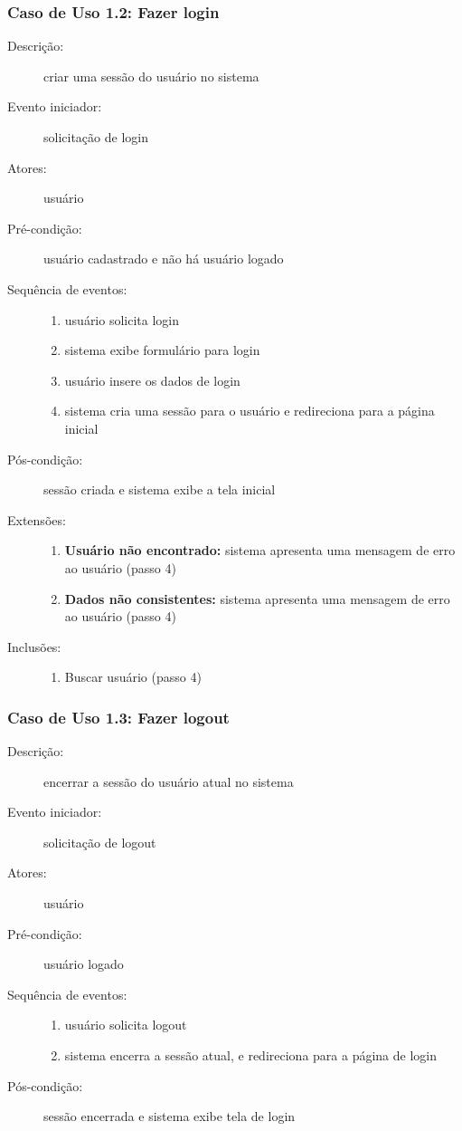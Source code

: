 \subsubsection{Caso de Uso 1.2: Fazer login}
\begin{description}
	\item[Descrição:] criar uma sessão do usuário no sistema
	\item[Evento iniciador:] solicitação de login
	\item[Atores:] usuário
	\item[Pré-condição:] usuário cadastrado e não há usuário logado
	\item[Sequência de eventos:] \hfill
		\begin{enumerate}
			\item{usuário solicita login}
			\item{sistema exibe formulário para login}
			\item{usuário insere os dados de login}
			\item{sistema cria uma sessão para o usuário e redireciona para a página inicial}
		\end{enumerate}
	\item[Pós-condição:] sessão criada e sistema exibe a tela inicial
	\item[Extensões:] \hfill
		\begin{enumerate}
			\item{\textbf{Usuário não encontrado:} sistema apresenta uma mensagem de erro ao usuário (passo 4)}
			\item{\textbf{Dados não consistentes:} sistema apresenta uma mensagem de erro ao usuário (passo 4)}
		\end{enumerate}
	\item[Inclusões:] \hfill
		\begin{enumerate}
			\item{Buscar usuário (passo 4)}
		\end{enumerate}
\end{description}
%
\subsubsection{Caso de Uso 1.3: Fazer logout}
\begin{description}
	\item[Descrição:] encerrar a sessão do usuário atual no sistema
	\item[Evento iniciador:] solicitação de logout
	\item[Atores:] usuário
	\item[Pré-condição:] usuário logado
	\item[Sequência de eventos:] \hfill
		\begin{enumerate}
			\item{usuário solicita logout}
			\item{sistema encerra a sessão atual, e redireciona para a página de login}
		\end{enumerate}
	\item[Pós-condição:] sessão encerrada e sistema exibe tela de login
\end{description}
%
